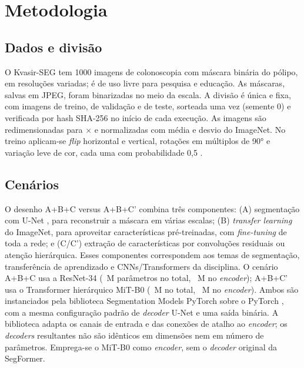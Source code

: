 \documentclass[conference]{IEEEtran}
\begin{document}
\section{Metodologia}

\subsection{Dados e divisão}
O Kvasir-SEG \cite{jha2020kvasir} tem 1000 imagens de colonoscopia com máscara binária do pólipo,
em resoluções variadas; é de uso livre para pesquisa e educação. As máscaras, salvas em JPEG,
foram binarizadas no meio da escala. A divisão é única e fixa, com \NTrain{} imagens de treino,
\NVal{} de validação e \NTest{} de teste, sorteada uma vez (semente 0) e verificada por hash
SHA-256 no início de cada execução. As imagens são redimensionadas para
\ImageSize$\times$\ImageSize{} e normalizadas com média e desvio do ImageNet. No treino aplicam-se
\textit{flip} horizontal e vertical, rotações em múltiplos de 90° e variação leve de cor, cada uma com
probabilidade 0,5 \cite{buslaev2020albumentations}.

\subsection{Cenários}
O desenho A+B+C versus A+B+C' combina três componentes: (A) segmentação com U-Net
\cite{ronneberger2015unet}, para reconstruir a máscara em várias escalas; (B)
\textit{transfer learning} do ImageNet, para aproveitar características pré-treinadas,
com \textit{fine-tuning} de toda a rede; e (C/C') extração de características por
convoluções residuais ou atenção hierárquica. Esses componentes correspondem aos temas de
segmentação, transferência de aprendizado e CNNs/Transformers da disciplina.
O cenário A+B+C usa a ResNet-34 \cite{he2016resnet} (\ParamsBase{}~M parâmetros no total,
\ParamsEncBase{}~M no \textit{encoder}); A+B+C' usa o Transformer hierárquico MiT-B0
\cite{xie2021segformer} (\ParamsAlt{}~M no total, \ParamsEncAlt{}~M no \textit{encoder}). Ambos
são instanciados pela biblioteca Segmentation Models PyTorch \cite{iakubovskii2019smp} sobre o
PyTorch \cite{paszke2019pytorch}, com a mesma configuração padrão de \textit{decoder} U-Net
e uma saída binária. A biblioteca adapta os canais de entrada e das conexões de atalho ao
\textit{encoder}; os \textit{decoders} resultantes não são idênticos em dimensões nem em
número de parâmetros. Emprega-se o MiT-B0 como \textit{encoder}, sem o \textit{decoder}
original da SegFormer.
\end{document}
